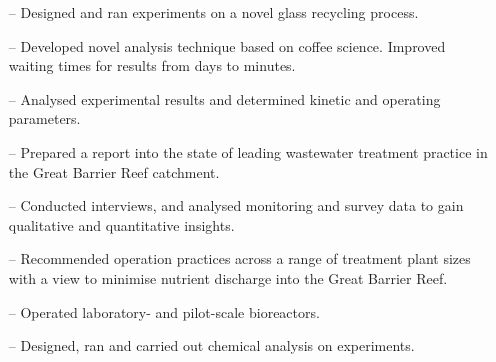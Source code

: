 \documentclass[10pt,a4paper]{altacv}
\begin{document}
\begin{itemize}
    \setlength{\itemindent}{0.5em}
    \item[--]   \small{Designed and ran experiments on a novel glass recycling process.}
    \item[--]   \small{Developed novel analysis technique based on coffee science. Improved waiting times for results from days to minutes.}
    \item[--]   \small{Analysed experimental results and determined kinetic and operating parameters.}
\end{itemize}
\divider\smallskip


\begin{itemize}
    \setlength{\itemindent}{0.5em}
    \item[--]   \small{Prepared a report into the state of leading wastewater treatment practice in the Great Barrier Reef catchment.}
    \item[--]   \small{Conducted interviews, and analysed monitoring and survey data to gain qualitative and quantitative insights.}
    \item[--]   \small{Recommended operation practices across a range of treatment plant sizes with a view to minimise         nutrient discharge into the Great Barrier Reef.}
\end{itemize}
\divider\smallskip


\begin{itemize}
    \setlength{\itemindent}{0.5em}
    \item[--]   \small{Operated laboratory- and pilot-scale bioreactors.}
    \item[--]   \small{Designed, ran and carried out chemical analysis on experiments.}
\end{itemize}

\divider\medskip







\newpage
\end{document}
